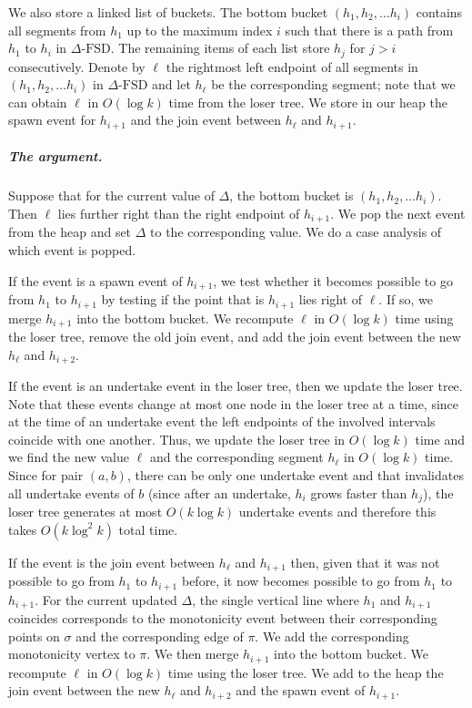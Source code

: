 \documentclass[10pt,a4paper]{article}
\newcommand{\dfs}{\Delta\text{-FSD}}
\begin{document}
We  also store a linked list of buckets. 
The bottom bucket $(h_1, h_2, \ldots h_i)$  contains all segments from $h_1$ up to the maximum index $i$ such that there is a path from $h_1$ to $h_i$ in $\dfs$. 
The remaining items of each list store $h_j$ for $j > i$ consecutively. 
Denote by $\ell$ the rightmost left endpoint of all segments in $(h_1, h_2, \ldots h_i)$ in $\dfs$ and let $h_\ell$ be the corresponding segment; note that we can obtain $\ell$ in $O(\log k)$ time from the loser tree.  We store in our heap the spawn event for $h_{i+1}$ and the join event between $h_\ell$ and $h_{i+1}$.

\subparagraph{The argument.}
Suppose that for the current value of $\Delta$, the bottom bucket is $(h_1, h_2, \ldots h_i)$.
Then $\ell$ lies further right than the right endpoint of $h_{i+1}$. 
We pop the next event from the heap and set $\Delta$ to the corresponding value. 
We do a case analysis of which event is popped. 


If the event is a spawn event of $h_{i+1}$, we test whether it becomes possible to go from $h_1$ to $h_{i+1}$ by testing if the point that is $h_{i+1}$ lies right of $\ell$. 
If so, we merge $h_{i+1}$ into the bottom bucket. 
We recompute $\ell$ in $O(\log k)$ time using the loser tree, remove the old join event, and add the join event between the new $h_\ell$ and $h_{i+2}$. 



If the event is an undertake event in the loser tree, then we update the loser tree.
Note that these events change at most one node in the loser tree at a time, since at the time of an undertake event the left endpoints of the involved intervals coincide with one another.
Thus, we update the loser tree in $O(\log k)$ time and we find the new value $\ell$ and the corresponding segment $h_\ell$ in $O(\log k)$ time. 
Since for pair $(a, b)$, there can be only one undertake event and that invalidates all undertake events of $b$ (since after an undertake, $h_i$ grows faster than $h_j$), the loser tree generates at most $O(k \log k)$ undertake events and therefore this takes $O(k \log^2 k)$ total time. 


If the event is the join event between $h_\ell$ and $h_{i+1}$ then, given that it was not possible to go from $h_1$ to $h_{i+1}$ before, it now becomes possible to go from $h_1$ to $h_{i+1}$. 
For the current updated $\Delta$, the single vertical line where $h_1$ and $h_{i+1}$ coincides corresponds to the monotonicity event between their corresponding points on $\sigma$ and the corresponding edge of $\pi$. We add the corresponding monotonicity vertex to $\pi$.
We then merge $h_{i+1}$ into the bottom bucket. 
We recompute $\ell$ in $O(\log k)$ time using the loser tree. We add to the heap the join event between the new $h_\ell$ and $h_{i+2}$ and the spawn event of $h_{i+1}$. 
\end{document}
